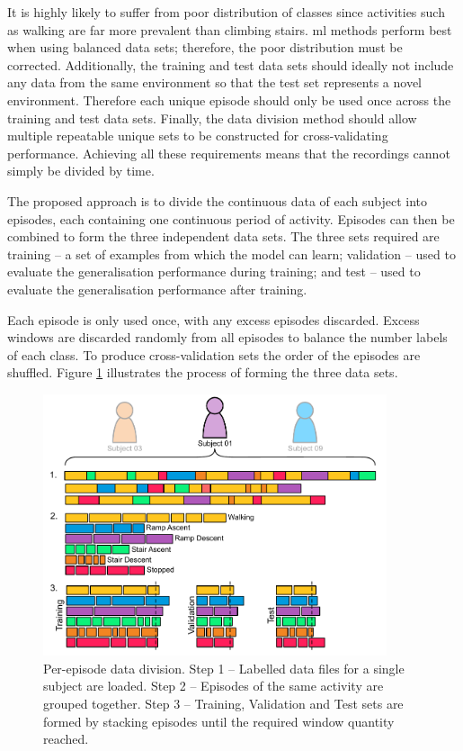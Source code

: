It is highly likely to suffer from poor distribution of classes since activities such as walking are far more prevalent than climbing stairs. \acrshort{ml} methods perform best when using balanced data sets; therefore, the poor distribution must be corrected. Additionally, the training and test data sets should ideally not include any data from the same environment so that the test set represents a novel environment. Therefore each unique episode should only be used once across the training and test data sets. Finally, the data division method should allow multiple repeatable unique sets to be constructed for cross-validating performance. Achieving all these requirements means that the recordings cannot simply be divided by time.

The proposed approach is to divide the continuous data of each subject into episodes, each containing one continuous period of activity. Episodes can then be combined to form the three independent data sets. The three sets required are training -- a set of examples from which the model can learn; validation -- used to evaluate the generalisation performance during training; and test -- used to evaluate the generalisation performance after training.

Each episode is only used once, with any excess episodes discarded. Excess windows are discarded randomly from all episodes to balance the number labels of each class. To produce cross-validation sets the order of the episodes are shuffled. Figure \ref{fig:methods-per-episode-data-division} illustrates the process of forming the three data sets.

\begin{figure}[hbt]
     \centering
     \includegraphics[width=0.9\textwidth]{content/5-Personalisation/Episode_Division.pdf}
     \caption[Per-episode data division]{Per-episode data division. Step 1 -- Labelled data files for a single subject are loaded. Step 2 -- Episodes of the same activity are grouped together. Step 3 -- Training, Validation and Test sets are formed by stacking episodes until the required window quantity reached.}
     \label{fig:methods-per-episode-data-division}
 \end{figure}
 
